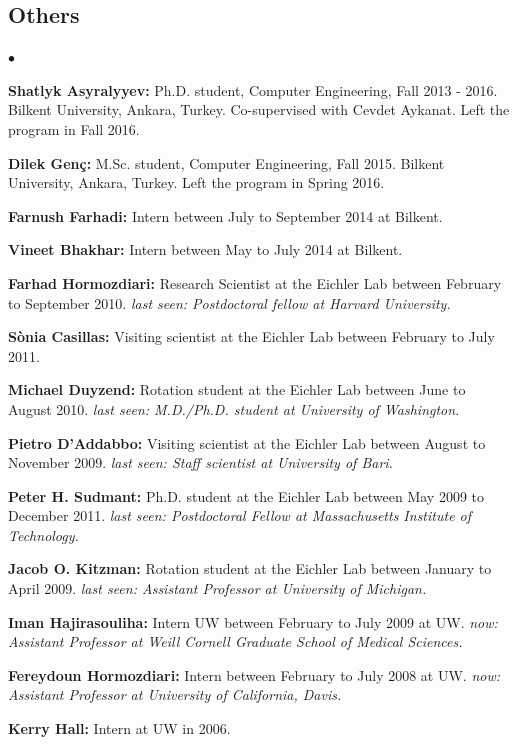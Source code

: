 \documentclass[margin,line]{res}
\newenvironment{list2}{
  \begin{list}{$\bullet$}{%
      \setlength{\itemsep}{0in}
      \setlength{\parsep}{0in} \setlength{\parskip}{0in}
      \setlength{\topsep}{0in} \setlength{\partopsep}{0in} 
      \setlength{\leftmargin}{0.2in}}}{\end{list}}
\begin{document}
\begin{resume}
\subsection{\small \sc Others}
\begin{list2}
\item
  {\bf Shatlyk Asyralyyev:} Ph.D. student, Computer Engineering, Fall 2013 - 2016.
  Bilkent University, Ankara, Turkey. Co-supervised with Cevdet Aykanat. Left the program in Fall 2016.
\item
{\bf Dilek Genç:} M.Sc. student, Computer Engineering, Fall 2015.
  Bilkent University, Ankara, Turkey. Left the program in Spring 2016. 
\item
  {\bf Farnush Farhadi:} Intern between July to September 2014 at Bilkent.
\item
  {\bf Vineet Bhakhar:} Intern between May to July 2014 at Bilkent. 
\item
  {\bf Farhad Hormozdiari:} Research Scientist at the Eichler Lab between February to September 2010.
  {\it last seen: Postdoctoral fellow  at Harvard University.}
\item
  {\bf S\`{o}nia Casillas:} Visiting scientist at the Eichler Lab between February to July 2011.
\item
  {\bf Michael Duyzend:} Rotation student at the Eichler Lab between June to August 2010.
  {\it last seen: M.D./Ph.D. student at University of Washington.}
\item
  {\bf Pietro D'Addabbo:} Visiting scientist at the Eichler Lab between August to November 2009.
  {\it last seen: Staff scientist at University of Bari.}
\item
  {\bf Peter H. Sudmant:} Ph.D. student at the Eichler Lab between May 2009 to December 2011.
  {\it last seen: Postdoctoral Fellow at Massachusetts Institute of Technology.}
\item
  {\bf Jacob O. Kitzman:} Rotation student at the Eichler Lab between January to April 2009.
  {\it last seen: Assistant Professor at University of Michigan.}
\item
  {\bf Iman Hajirasouliha:}  Intern UW between February to July 2009 at UW.
  {\it now: Assistant Professor at Weill Cornell Graduate School of Medical Sciences.}
\item
  {\bf Fereydoun Hormozdiari:} Intern between February to July 2008 at UW. 
  {\it now: Assistant Professor at University of California, Davis.}
\item
  {\bf Kerry Hall:} Intern at UW in 2006.  
\end{list2}



\end{resume}
\end{document}
